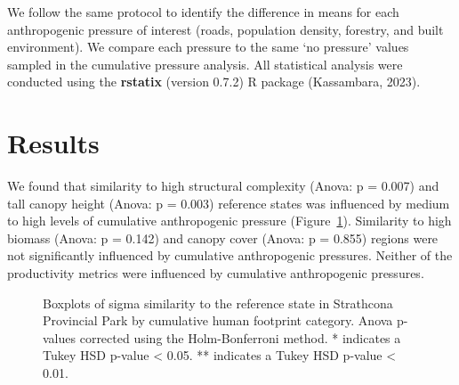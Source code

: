 \documentclass[
]{agujournal2019}
\begin{document}
We follow the same protocol to identify the difference in means for each
anthropogenic pressure of interest (roads, population density, forestry,
and built environment). We compare each pressure to the same `no
pressure' values sampled in the cumulative pressure analysis. All
statistical analysis were conducted using the \textbf{rstatix} (version
0.7.2) R package (Kassambara, 2023).

\section{Results}\label{results}

We found that similarity to high structural complexity (Anova: p =
0.007) and tall canopy height (Anova: p = 0.003) reference states was
influenced by medium to high levels of cumulative anthropogenic pressure
(Figure~\ref{fig-boxplot-overall}). Similarity to high biomass (Anova: p
= 0.142) and canopy cover (Anova: p = 0.855) regions were not
significantly influenced by cumulative anthropogenic pressures. Neither
of the productivity metrics were influenced by cumulative anthropogenic
pressures.

\label{cell-fig-boxplot-overall}
\begin{figure}[H]


\caption{\label{fig-boxplot-overall}Boxplots of sigma similarity to the
reference state in Strathcona Provincial Park by cumulative human
footprint category. Anova p-values corrected using the Holm-Bonferroni
method. * indicates a Tukey HSD p-value \textless{} 0.05. ** indicates a
Tukey HSD p-value \textless{} 0.01.}

\end{figure}%
\end{document}
